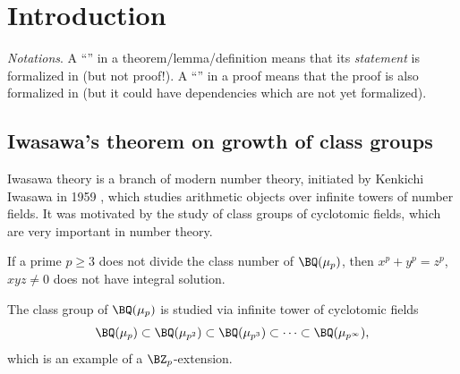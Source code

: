 
%

\tableofcontents

\section{Introduction}

\emph{Notations}.
A ``{\checkmark}'' in a theorem/lemma/definition means that its \emph{statement}
is formalized in {\Lean} (but not proof!). A ``{\checkmark}'' in a proof means that
the proof is also formalized in {\Lean} (but it could have dependencies which
are not yet formalized).

\subsection{Iwasawa's theorem on growth of class groups}

Iwasawa theory is a branch of modern number theory,
initiated by Kenkichi Iwasawa in 1959 \cite{Iwa59},
which studies arithmetic objects
over infinite towers of number fields.
It was motivated by the study of
class groups of cyclotomic fields, which are very important in number theory.

\begin{thm}
\label{flt-regular}
If a prime $p\geq 3$ does not divide the class number of $\BQ(\mu_p)$, then
$x^p+y^p=z^p$, $xyz\neq 0$ does not have integral solution.
\end{thm}

The class group of $\BQ(\mu_p)$ is studied via
infinite tower of cyclotomic fields
$$
\BQ(\mu_p)\subset\BQ(\mu_{p^2})\subset\BQ(\mu_{p^3})\subset\cdots
\subset\BQ(\mu_{p^\infty}),
$$
which is an example of a $\BZ_p$-extension.


